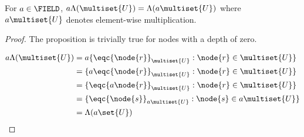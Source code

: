 \begin{proposition}\label{sLambda}
  For $a \in \FIELD$, $a \Lambda(\multiset{U}) = \Lambda(a\multiset{U})$ where $a\multiset{U}$ denotes element-wise
  multiplication.
  \begin{proof}
    The proposition is trivially true for nodes with a depth of zero.

    \begin{align*}
      a\Lambda(\multiset{U}) &= a \{\eqc{\node{r}}_{\multiset{U}}: \node{r}\in\multiset{U}\}\\ 
      &= \{a\eqc{\node{r}}_{\multiset{U}}: \node{r}\in\multiset{U}\}\\ 
      &= \{\eqc{a\node{r}}_{\multiset{U}}: \node{r}\in\multiset{U}\}\\
      &= \{\eqc{\node{s}}_{a\multiset{U}}: \node{s}\in a \multiset{U}\}\\
      &= \Lambda(a\set{U})
    \end{align*}
  \end{proof}   
\end{proposition}

  



